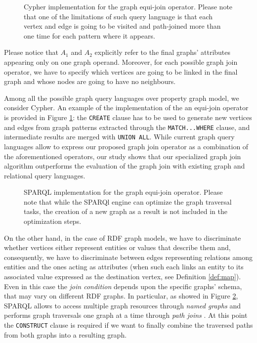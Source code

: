 \begin{description}
	\begin{figure}[!p]
	    \begin{minipage}[t]{\textwidth}
	      
	      \caption{Cypher implementation for the graph equi-join operator. Please note that one of the limitations of such query language is that each vertex and edge is going to be visited and path-joined more than one time for each pattern where it appears.}
	      \label{fig:CypherEquiJoin}
	    \end{minipage}
	\end{figure}
	Please notice that $A_1$ and $A_2$ explicitly refer to the final graphs' attributes appearing only on one graph operand.
	Moreover, for each possible graph join operator, we have to specify which vertices are going to be
	linked in the final graph and whose nodes are going to have no neighbours. 
	
	Among all the possible graph query languages over property graph model, we consider Cypher. An example of the implementation of the an equi-join operator is provided in Figure \ref{fig:CypherEquiJoin}: the
	\texttt{CREATE} clause has to be used to generate new vertices and edges from graph patterns
	extracted through the \texttt{MATCH...WHERE} clause, and intermediate results are merged with
	\texttt{UNION ALL}.
	While current graph query languages allow to express our proposed graph
	join operator as a combination of the aforementioned operators,  our study shows that our specialized graph join
	algorithm outperforms the evaluation of the graph join with existing graph and relational query languages.
	\medskip

	\begin{figure}[!p]
	    \begin{minipage}[t]{\textwidth}
	      
	      \caption{SPARQL implementation for the graph equi-join operator. Please note that while the SPARQl engine can optimize the graph traversal tasks, the creation of a new graph as a result is not included in the optimization steps.}
	      \label{fig:SparqlEquiJoin}
	    \end{minipage}
	\end{figure}
	On the other hand, in the case of RDF graph models, we have to discriminate whether vertices either represent entities or
	values that describe them and, consequently, we have to discriminate between edges representing
	relations among entities and the ones  acting as  attributes (when such each links an entity to its associated value
	expressed as the destination vertex, see Definition \vref{def:map}).
	Even in this case the \textit{join condition} depends upon the specific graphs' schema,
	that may vary on different RDF graphs. In particular, as showed in Figure \ref{fig:SparqlEquiJoin}, SPARQL allows to access multiple graph resources
	through \textit{named graphs} and performs graph traversals one graph at a time through
	\textit{path joins} \cite{Fletcher09,Atre,Yuan}.
	At this point the \texttt{CONSTRUCT} clause is required if we
	want to finally combine the traversed paths from both graphs into a resulting graph.


\end{description}
